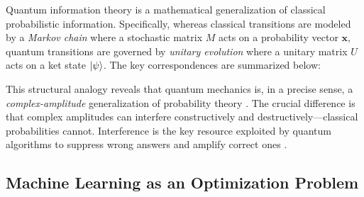 \documentclass[aps, reprint, twocolumn, superscriptaddress, floatfix]{revtex4-2}
\begin{document}
Quantum information theory is a mathematical generalization of classical
probabilistic information.  Specifically, whereas classical transitions are
modeled by a \emph{Markov chain} where a stochastic matrix $M$ acts on a
probability vector $\mathbf{x}$, quantum transitions are governed by
\emph{unitary evolution} where a unitary matrix $U$ acts on a ket state 
$\ket{\psi}$. The key correspondences are summarized below:
\begin{center}
\end{center}
This structural analogy reveals that quantum mechanics is, in a precise sense, a
\emph{complex-amplitude} generalization of probability theory \cite{watrous2018theory}.
The crucial difference is that complex amplitudes can interfere constructively and
destructively---classical probabilities cannot.  Interference is the key
resource exploited by quantum algorithms to suppress wrong answers and amplify
correct ones \cite{nielsen2010quantum}.

\subsection{Machine Learning as an Optimization Problem}
\label{ssec:ml-opt}
\end{document}
